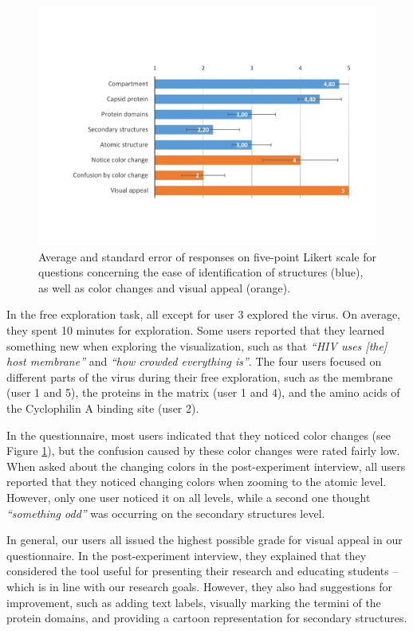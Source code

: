 \documentclass{egpubl}
\begin{document}
	 \begin{figure}
\centering
\includegraphics[width=0.9\linewidth]{Figures/questionnaires.pdf}
\caption{Average and standard error of responses on five-point Likert scale for questions concerning the ease of identification of structures (blue), as well as color changes and visual appeal (orange).}
\label{fig:questionnaire}
\end{figure}

In the free exploration task, all except for user 3 explored the virus. 
On average, they spent 10 minutes for exploration. 
Some users reported that they learned something new when exploring the visualization, such as that \textit{``HIV uses [the] host membrane''} and \textit{``how crowded everything is''}. 
The four users focused on different parts of the virus during their free exploration, such as the membrane (user 1 and 5), the proteins in the matrix (user 1 and 4), and the amino acids of the Cyclophilin A binding site (user 2). 

In the questionnaire, most users indicated that they noticed color changes (see Figure \ref{fig:questionnaire}), but the confusion caused by these color changes were rated fairly low. 
When asked about the changing colors in the post-experiment interview, all users reported that they noticed changing colors when zooming to the atomic level. 
However, only one user noticed it on all levels, while a second one thought \textit{``something odd''} was occurring on the secondary structures level. 

In general, our users all issued the highest possible grade for visual appeal in our questionnaire. 
In the post-experiment interview, they explained that they considered the tool useful for presenting their research and educating students -- which is in line with our research goals. 
However, they also had suggestions for improvement, such as adding text labels, visually marking the termini of the protein domains, and providing a cartoon representation for secondary structures. 
\end{document}
